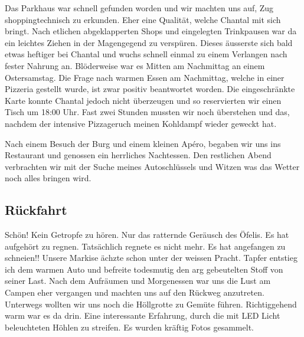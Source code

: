 Das Parkhaus war schnell gefunden worden und wir machten uns auf, Zug shoppingtechnisch zu erkunden.
Eher eine Qualität, welche Chantal mit sich bringt.
Nach etlichen abgeklapperten Shops und eingelegten Trinkpausen war da ein leichtes Ziehen in der Magengegend zu verspüren.
Dieses äusserste sich bald etwas heftiger bei Chantal und wuchs schnell einmal zu einem Verlangen nach fester Nahrung an.
Blöderweise war es Mitten am Nachmittag an einem Ostersamstag.
Die Frage nach warmen Essen am Nachmittag, welche in einer Pizzeria gestellt wurde, ist zwar positiv beantwortet worden.
Die eingeschränkte Karte konnte Chantal jedoch nicht überzeugen und so reservierten wir einen Tisch um 18:00 Uhr.
Fast zwei Stunden mussten wir noch überstehen und das, nachdem der intensive Pizzageruch meinen Kohldampf wieder geweckt hat.

Nach einem Besuch der Burg und einem kleinen Apéro, begaben wir uns ins Restaurant und genossen ein herrliches Nachtessen.
Den restlichen Abend verbrachten wir mit der Suche meines Autoschlüssels und Witzen was das Wetter noch alles bringen wird.

\subsection{Rückfahrt}
Schön! Kein Getropfe zu hören.
Nur das ratternde Geräusch des Öfelis.
Es hat aufgehört zu regnen.
Tatsächlich regnete es nicht mehr.
Es hat angefangen zu schneien!! Unsere Markise ächzte schon unter der weissen Pracht.
Tapfer entstieg ich dem warmen Auto und befreite todesmutig den arg gebeutelten Stoff von seiner Last.
Nach dem Aufräumen und Morgenessen war uns die Lust am Campen eher vergangen und machten uns auf den Rückweg anzutreten.
Unterwegs wollten wir uns noch die Höllgrotte zu Gemüte führen.
Richtiggehend warm war es da drin.
Eine interessante Erfahrung, durch die mit LED Licht beleuchteten Höhlen zu streifen.
Es wurden kräftig Fotos gesammelt.

